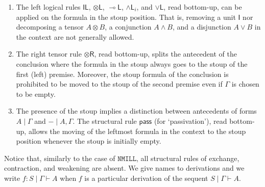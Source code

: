 \documentclass[submission,copyright,creativecommons]{eptcs}
\theoremstyle{definition}
\newcommand{\tl}{\otimes \mathsf{L}}
\newcommand{\tr}{\otimes \mathsf{R}}
\newcommand{\lleft}{{\multimap}\mathsf{L}}
\newcommand{\pass}{\mathsf{pass}}
\newcommand{\unitl}{\mathsf{IL}}
\newcommand{\andli}{\land \mathsf{L}_{i}}
\newcommand{\orl}{\lor \mathsf{L}}
\newcommand{\ot}{\otimes}
\newcommand{\lolli}{\multimap}
\newcommand{\illol}{\rotatebox[origin=c]{180}{$\multimap$}}
\newcommand{\I}{\mathsf{I}}
\newcommand{\NMILL}{$\mathtt{NMILL}$}
\newcommand{\SkNMILL}{$\mathtt{SkNMILL}$}
\begin{document}
\begin{enumerate}
\item The left logical rules $\unitl$, $\tl$, $\lleft$, $\andli$, and $\orl$, read bottom-up, can be applied on the formula in the stoup position. 
That is, removing a unit $\I$ nor decomposing a tensor $A \ot B$, a conjunction $A \land B$, and a disjunction $A \lor B$ in the context are not generally allowed.
\item The right tensor rule $\tr$, read bottom-up, splits the antecedent of the conclusion where the formula in the stoup always goes to the stoup of the first (left) premise.
Moreover, the stoup formula of the conclusion is prohibited to be moved to the stoup of the second premise even if $\Gamma$ is chosen to be empty. 
\item The presence of the stoup implies a distinction between antecedents of forms $A \mid \Gamma$ and ${-} \mid A, \Gamma$. The structural rule $\pass$ (for `passivation'), read bottom-up, allows the moving of the leftmost formula in the context to the stoup position whenever the stoup is initially empty.
\end{enumerate}

Notice that, similarly to the case of \NMILL, all structural rules of exchange, contraction, and weakening are absent. We give names to derivations and we write $f : S \mid \Gamma \vdash A$ when $f$ is a particular derivation of the sequent $S \mid \Gamma \vdash A$.
\end{document}
